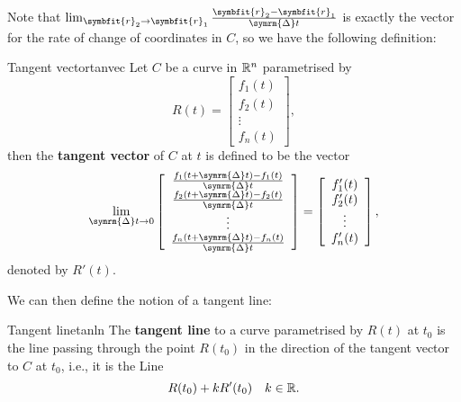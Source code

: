 \documentclass[math]{amznotes}
\theoremstyle{remark}
\begin{document}
Note that $\lim_{\symbfit{r}_2 \to \symbfit{r}_1}\frac{\symbfit{r}_2 - \symbfit{r}_1}{\symrm{\Delta} t}$ is exactly the vector for the rate of change of coordinates in $C$, so we have the following definition:
\begin{dfnbox}{Tangent vector}{tanvec}
    Let $C$ be a curve in $\mathbb{R}^n$ parametrised by
    \begin{equation*}
        R(t) = \left[\begin{array}{c}
                f_1(t) \\
                f_2(t) \\
                \vdots \\
                f_n(t)
            \end{array}\right],
    \end{equation*}
    then the {\color{red} \textbf{tangent vector}} of $C$ at $t$ is defined to be the vector
    \begin{equation*}
        \lim_{\symrm{\Delta} t \to 0} \left[\begin{array}{c}
                \frac{f_1(t + \symrm{\Delta} t) - f_1(t)}{\symrm{\Delta} t} \\
                \frac{f_2(t + \symrm{\Delta} t) - f_2(t)}{\symrm{\Delta} t} \\
                \vdots                                                      \\
                \frac{f_n(t + \symrm{\Delta} t) - f_n(t)}{\symrm{\Delta} t}
            \end{array}\right] = \left[\begin{array}{c}
                f'_1(t) \\
                f'_2(t) \\
                \vdots  \\
                f'_n(t)
            \end{array}\right],
    \end{equation*}
    denoted by $R'(t)$.
\end{dfnbox}
We can then define the notion of a tangent line:
\begin{dfnbox}{Tangent line}{tanln}
    The {\color{red} \textbf{tangent line}} to a curve parametrised by $R(t)$ at $t_0$ is the line passing through the point $R(t_0)$ in the direction of the tangent vector to $C$ at $t_0$, i.e., it is the Line
    \begin{displaymath}
        R(t_0) + kR'(t_0) \quad k \in \mathbb{R}.
    \end{displaymath}
\end{dfnbox}
\end{document}
